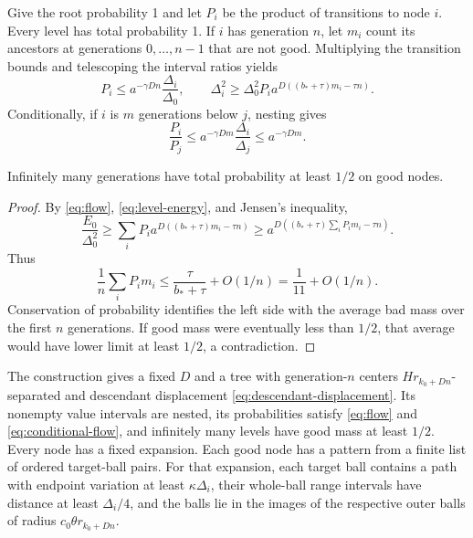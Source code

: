 Give the root probability 1 and let $P_i$ be the product of transitions
to node $i$. Every level has total probability 1. If $i$ has generation
$n$, let $m_i$ count its ancestors at generations $0,\ldots,n-1$ that
are not good. Multiplying the transition bounds and telescoping the
interval ratios yields
\begin{equation}
 P_i\leq a^{-\gamma Dn}\frac{\Delta_i}{\Delta_0},\qquad
 \Delta_i^2\geq\Delta_0^2P_i
 a^{D((b_*+\tau)m_i-\tau n)}.
 \label{eq:flow}
\end{equation}
Conditionally, if $i$ is $m$ generations below $j$, nesting gives
\begin{equation}
 \frac{P_i}{P_j}\leq a^{-\gamma Dm}\frac{\Delta_i}{\Delta_j}
 \leq a^{-\gamma Dm}.
 \label{eq:conditional-flow}
\end{equation}

\begin{lemma}
\label{lem:good-levels}
Infinitely many generations have total probability at least $1/2$
on good nodes.
\end{lemma}
\begin{proof}
By \eqref{eq:flow}, \eqref{eq:level-energy}, and Jensen's inequality,
\[
 \frac{E_0}{\Delta_0^2}
 \geq\sum_iP_i a^{D((b_*+\tau)m_i-\tau n)}
 \geq a^{D((b_*+\tau)\sum_iP_im_i-\tau n)}.
\]
Thus
\[
 \frac1n\sum_iP_im_i\leq\frac{\tau}{b_*+\tau}+O(1/n)
 =\frac1{11}+O(1/n).
\]
Conservation of probability identifies the left side with the average
bad mass over the first $n$ generations. If good mass were eventually
less than $1/2$, that average would have lower limit at least $1/2$,
a contradiction.
\end{proof}

\begin{proposition}
\label{prop:probability-flow}
The construction gives a fixed $D$ and a tree with generation-$n$
centers $Hr_{k_0+Dn}$-separated and descendant displacement
\eqref{eq:descendant-displacement}. Its nonempty value intervals are
nested, its probabilities satisfy \eqref{eq:flow} and
\eqref{eq:conditional-flow}, and infinitely many levels have good mass
at least $1/2$. Every node has a fixed expansion. Each good node has
a pattern from a finite list of ordered target-ball pairs. For that expansion,
each target ball contains a path with endpoint variation at least
$\kappa\Delta_i$, their whole-ball range intervals have distance at
least $\Delta_i/4$, and the balls lie in the images of the respective
outer balls of radius $c_0\theta r_{k_0+Dn}$.
\end{proposition}
